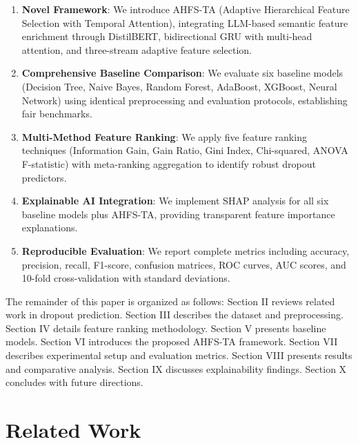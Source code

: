 \documentclass[journal]{IEEEtran}
\begin{document}
\begin{enumerate}
\item \textbf{Novel Framework}: We introduce AHFS-TA (Adaptive Hierarchical Feature Selection with Temporal Attention), integrating LLM-based semantic feature enrichment through DistilBERT, bidirectional GRU with multi-head attention, and three-stream adaptive feature selection.

\item \textbf{Comprehensive Baseline Comparison}: We evaluate six baseline models (Decision Tree, Naive Bayes, Random Forest, AdaBoost, XGBoost, Neural Network) using identical preprocessing and evaluation protocols, establishing fair benchmarks.

\item \textbf{Multi-Method Feature Ranking}: We apply five feature ranking techniques (Information Gain, Gain Ratio, Gini Index, Chi-squared, ANOVA F-statistic) with meta-ranking aggregation to identify robust dropout predictors.

\item \textbf{Explainable AI Integration}: We implement SHAP analysis for all six baseline models plus AHFS-TA, providing transparent feature importance explanations.

\item \textbf{Reproducible Evaluation}: We report complete metrics including accuracy, precision, recall, F1-score, confusion matrices, ROC curves, AUC scores, and 10-fold cross-validation with standard deviations.
\end{enumerate}

The remainder of this paper is organized as follows: Section II reviews related work in dropout prediction. Section III describes the dataset and preprocessing. Section IV details feature ranking methodology. Section V presents baseline models. Section VI introduces the proposed AHFS-TA framework. Section VII describes experimental setup and evaluation metrics. Section VIII presents results and comparative analysis. Section IX discusses explainability findings. Section X concludes with future directions.

\section{Related Work}
\end{document}
